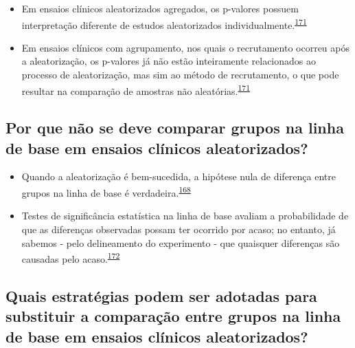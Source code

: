 \documentclass[
  a4paper,
]{book}
\begin{document}
\begin{itemize}
\item
  Em ensaios clínicos aleatorizados agregados, os p-valores possuem interpretação diferente de estudos aleatorizados individualmente.\textsuperscript{\protect\hyperlink{ref-Bolzern2019}{171}}
\item
  Em ensaios clínicos com agrupamento, nos quais o recrutamento ocorreu após a aleatorização, os p-valores já não estão inteiramente relacionados ao processo de aleatorização, mas sim ao método de recrutamento, o que pode resultar na comparação de amostras não aleatórias.\textsuperscript{\protect\hyperlink{ref-Bolzern2019}{171}}
\end{itemize}

\hypertarget{por-que-nuxe3o-se-deve-comparar-grupos-na-linha-de-base-em-ensaios-cluxednicos-aleatorizados}{%
\subsection{Por que não se deve comparar grupos na linha de base em ensaios clínicos aleatorizados?}\label{por-que-nuxe3o-se-deve-comparar-grupos-na-linha-de-base-em-ensaios-cluxednicos-aleatorizados}}

\begin{itemize}
\item
  Quando a aleatorização é bem-sucedida, a hipótese nula de diferença entre grupos na linha de base é verdadeira.\textsuperscript{\protect\hyperlink{ref-roberts1999}{168}}
\item
  Testes de significância estatística na linha de base avaliam a probabilidade de que as diferenças observadas possam ter ocorrido por acaso; no entanto, já sabemos - pelo delineamento do experimento - que quaisquer diferenças são causadas pelo acaso.\textsuperscript{\protect\hyperlink{ref-gruijters2020}{172}}
\end{itemize}

\hypertarget{quais-estratuxe9gias-podem-ser-adotadas-para-substituir-a-comparauxe7uxe3o-entre-grupos-na-linha-de-base-em-ensaios-cluxednicos-aleatorizados}{%
\subsection{Quais estratégias podem ser adotadas para substituir a comparação entre grupos na linha de base em ensaios clínicos aleatorizados?}\label{quais-estratuxe9gias-podem-ser-adotadas-para-substituir-a-comparauxe7uxe3o-entre-grupos-na-linha-de-base-em-ensaios-cluxednicos-aleatorizados}}
\end{document}

